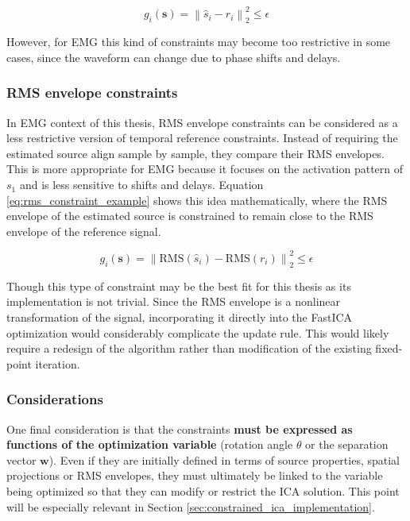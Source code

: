\begin{equation}
    g_i(\mathbf{s})
    =
    \left\|
    \hat{s}_i - r_i
    \right\|_2^2
    \leq \epsilon
    \label{eq:temporal_constraint_example}
\end{equation}

However, for EMG this kind of constraints may become too restrictive in some cases, since the waveform can change due to phase shifts and delays.

\subsubsection{RMS envelope constraints}
In EMG context of this thesis,  RMS envelope constraints can be considered as a less restrictive version of temporal reference constraints. Instead of requiring the estimated source align sample by sample, they compare their RMS envelopes. This is more appropriate for EMG because it focuses on the activation pattern of $s_1$ and is less sensitive to shifts and delays.  Equation \ref{eq:rms_constraint_example} shows this idea mathematically, where the RMS envelope of the estimated source is constrained to remain close to the RMS envelope of the reference signal.


\begin{equation}
    g_i(\mathbf{s})
    =
    \left\|
    \mathrm{RMS}(\hat{s}_i)
    -
    \mathrm{RMS}(r_i)
    \right\|_2^2
    \leq \epsilon
    \label{eq:rms_constraint_example}
\end{equation}

Though this type of constraint may be the best fit for this thesis as its implementation is not trivial. Since the RMS envelope is a nonlinear transformation of the signal, incorporating it directly into the FastICA optimization would considerably complicate the update rule. This would likely require a redesign of the algorithm rather than modification of the existing fixed-point iteration.


\subsubsection{Considerations}

One final consideration is that the constraints \textbf{must be expressed as functions of the optimization variable} (rotation angle $\theta$ or the separation vector $\mathbf{w}$). Even if they are initially defined in terms of source properties, spatial projections or RMS envelopes, they must ultimately be linked to the variable being optimized so that they can modify or restrict the ICA solution. This point will be especially relevant in Section \ref{sec:constrained_ica_implementation}.


